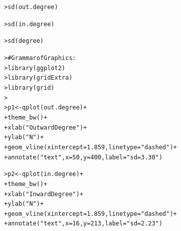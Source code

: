 \documentclass[12pt]{article}\usepackage[]{graphicx}\usepackage[]{color}
\makeatletter
\newcommand{\hlnum}[1]{\textcolor[rgb]{0.82,0.78,0.62}{#1}}%
\newcommand{\hlstr}[1]{\textcolor[rgb]{0.82,0.78,0.62}{#1}}%
\newcommand{\hlcom}[1]{\textcolor[rgb]{0.404,0.408,0.42}{#1}}%
\newcommand{\hlopt}[1]{\textcolor[rgb]{0.882,0.878,0.898}{#1}}%
\newcommand{\hlstd}[1]{\textcolor[rgb]{0.882,0.878,0.898}{#1}}%
\newcommand{\hlkwb}[1]{\textcolor[rgb]{0.902,0.675,0.196}{#1}}%
\newcommand{\hlkwc}[1]{\textcolor[rgb]{0.812,0.522,0.388}{#1}}%
\newcommand{\hlkwd}[1]{\textcolor[rgb]{0.733,0.388,0.812}{#1}}%
\newenvironment{kframe}{%
 \def\at@end@of@kframe{}%
 \ifinner\ifhmode%
  \def\at@end@of@kframe{\end{minipage}}%
  \begin{minipage}{\columnwidth}%
 \fi\fi%
 \def\FrameCommand##1{\hskip\@totalleftmargin \hskip-\fboxsep
 \colorbox{shadecolor}{##1}\hskip-\fboxsep
     \hskip-\linewidth \hskip-\@totalleftmargin \hskip\columnwidth}%
 \MakeFramed {\advance\hsize-\width
   \@totalleftmargin\z@ \linewidth\hsize
   \@setminipage}}%
 {\par\unskip\endMakeFramed%
 \at@end@of@kframe}
\newenvironment{knitrout}{}{} %
\makeatother
\begin{document}
\begin{flushleft}
\begin{center}
\begin{knitrout}
\begin{kframe}
{\ttfamily\noindent\bfseries\color{errorcolor}{\#\# Error in object[[i]]: object of type 'closure' is not subsettable}}\begin{alltt}
\hlstd{> }\hlkwd{sd}\hlstd{(out.degree)}
\end{alltt}


{\ttfamily\noindent\bfseries\color{errorcolor}{\#\# Error in is.data.frame(x): object 'out.degree' not found}}\begin{alltt}
\hlstd{> }\hlkwd{sd}\hlstd{(in.degree)}
\end{alltt}


{\ttfamily\noindent\bfseries\color{errorcolor}{\#\# Error in is.data.frame(x): object 'in.degree' not found}}\begin{alltt}
\hlstd{> }\hlkwd{sd}\hlstd{(degree)}
\end{alltt}


{\ttfamily\noindent\bfseries\color{errorcolor}{\#\# Error in as.double(x): cannot coerce type 'closure' to vector of type 'double'}}\begin{alltt}
\hlstd{> }\hlcom{# Grammar of Graphics:}
\hlstd{> }\hlkwd{library}\hlstd{(ggplot2)}
\hlstd{> }\hlkwd{library}\hlstd{(gridExtra)}
\hlstd{> }\hlkwd{library}\hlstd{(grid)}
\hlstd{> }
\hlstd{> }\hlstd{p1} \hlkwb{<-} \hlkwd{qplot}\hlstd{(out.degree)}\hlopt{+}
\hlstd{+ }     \hlkwd{theme_bw}\hlstd{()}\hlopt{+}
\hlstd{+ }     \hlkwd{xlab}\hlstd{(}\hlstr{"Outward Degree"}\hlstd{)}\hlopt{+}
\hlstd{+ }     \hlkwd{ylab}\hlstd{(}\hlstr{"N"}\hlstd{)}\hlopt{+}
\hlstd{+ }     \hlkwd{geom_vline}\hlstd{(}\hlkwc{xintercept}\hlstd{=}\hlnum{1.859}\hlstd{,} \hlkwc{linetype}\hlstd{=}\hlstr{"dashed"}\hlstd{)}\hlopt{+}
\hlstd{+ }     \hlkwd{annotate}\hlstd{(}\hlstr{"text"}\hlstd{,} \hlkwc{x} \hlstd{=} \hlnum{50}\hlstd{,} \hlkwc{y} \hlstd{=} \hlnum{400}\hlstd{,} \hlkwc{label} \hlstd{=} \hlstr{"sd = 3.30"}\hlstd{)}
\end{alltt}


{\ttfamily\noindent\bfseries\color{errorcolor}{\#\# Error in eval\_tidy(mapping\$x, data, caller\_env): object 'out.degree' not found}}\begin{alltt}
\hlstd{> }\hlstd{p2} \hlkwb{<-} \hlkwd{qplot}\hlstd{(in.degree)}\hlopt{+}
\hlstd{+ }     \hlkwd{theme_bw}\hlstd{()}\hlopt{+}
\hlstd{+ }     \hlkwd{xlab}\hlstd{(}\hlstr{"Inward Degree"}\hlstd{)}\hlopt{+}
\hlstd{+ }     \hlkwd{ylab}\hlstd{(}\hlstr{"N"}\hlstd{)}\hlopt{+}
\hlstd{+ }     \hlkwd{geom_vline}\hlstd{(}\hlkwc{xintercept}\hlstd{=}\hlnum{1.859}\hlstd{,} \hlkwc{linetype}\hlstd{=}\hlstr{"dashed"}\hlstd{)}\hlopt{+}
\hlstd{+ }     \hlkwd{annotate}\hlstd{(}\hlstr{"text"}\hlstd{,} \hlkwc{x} \hlstd{=} \hlnum{16}\hlstd{,} \hlkwc{y} \hlstd{=} \hlnum{213}\hlstd{,} \hlkwc{label} \hlstd{=} \hlstr{"sd = 2.23"}\hlstd{)}
\end{alltt}



\end{kframe}
\end{knitrout}
\end{center}
\end{flushleft}
\end{document}
